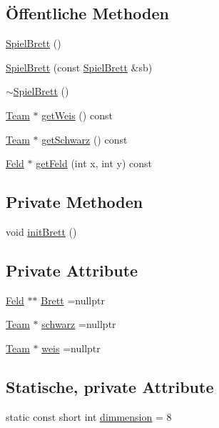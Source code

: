 \subsection*{Öffentliche Methoden}
\begin{DoxyCompactItemize}
\item 
\hyperlink{class_spiel_brett_abd1c86dc9518ff9c368b43d8c49db6c0}{Spiel\+Brett} ()
\item 
\hyperlink{class_spiel_brett_aa81d890cf06cc6c834f98cb0411d9026}{Spiel\+Brett} (const \hyperlink{class_spiel_brett}{Spiel\+Brett} \&sb)
\item 
\hyperlink{class_spiel_brett_ab61306e45606cab9ab9d073c43cf30f8}{$\sim$\+Spiel\+Brett} ()
\item 
\hyperlink{class_team}{Team} $\ast$ \hyperlink{class_spiel_brett_acb3a18d766bd52142672b8d0300d6686}{get\+Weis} () const 
\item 
\hyperlink{class_team}{Team} $\ast$ \hyperlink{class_spiel_brett_a30fb11863bee09200875119d15d282b1}{get\+Schwarz} () const 
\item 
\hyperlink{class_feld}{Feld} $\ast$ \hyperlink{class_spiel_brett_a6fc31b54e16797baf80285872ce2dab1}{get\+Feld} (int x, int y) const 
\end{DoxyCompactItemize}
\subsection*{Private Methoden}
\begin{DoxyCompactItemize}
\item 
void \hyperlink{class_spiel_brett_a1a4090a83c4c6fc7205ee80764bebcf0}{init\+Brett} ()
\end{DoxyCompactItemize}
\subsection*{Private Attribute}
\begin{DoxyCompactItemize}
\item 
\hyperlink{class_feld}{Feld} $\ast$$\ast$ \hyperlink{class_spiel_brett_a507b430b3d9f96db6eaa02b9dd9d5f99}{Brett} =nullptr
\item 
\hyperlink{class_team}{Team} $\ast$ \hyperlink{class_spiel_brett_afc28f676d2b3556b29adbf0ef32ba679}{schwarz} =nullptr
\item 
\hyperlink{class_team}{Team} $\ast$ \hyperlink{class_spiel_brett_aa5c83f7c16af3ea1c51d2ea9745875ac}{weis} =nullptr
\end{DoxyCompactItemize}
\subsection*{Statische, private Attribute}
\begin{DoxyCompactItemize}
\item 
static const short int \hyperlink{class_spiel_brett_a428ac783e187cd6a25f15b833555312a}{dimmension} = 8
\end{DoxyCompactItemize}


